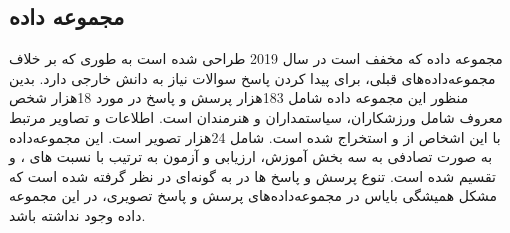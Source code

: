 \subsection{مجموعه داده }
{
	مجموعه داده 
	 که مخفف
	است در سال 2019 طراحی شده است به طوری که بر خلاف مجموعه‌داده‌های قبلی، برای پیدا کردن پاسخ سوالات نیاز به دانش خارجی دارد. بدین منظور این مجموعه داده شامل 183هزار پرسش و پاسخ در مورد 18هزار شخص معروف شامل ورزشکاران، سیاستمداران و هنرمندان است.  اطلاعات و تصاویر مرتبط با این  اشخاص از
	و
	استخراج شده است.
شامل 24هزار تصویر است. این مجموعه‌داده به صورت تصادفی به سه بخش آموزش، ارزیابی و آزمون به ترتیب با نسبت های
 	، 
  و
   تقسیم شده است. تنوع پرسش و پاسخ ها در 
	به گونه‌ای در نظر گرفته شده است که مشکل همیشگی بایاس در مجموعه‌داده‌های پرسش و پاسخ تصویری، در این مجموعه داده وجود نداشته باشد.
}


